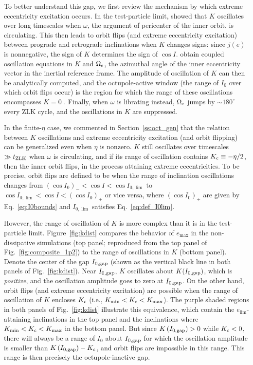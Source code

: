 \documentclass[
        fleqn,
        usenatbib,
    ]{mnras}
\newcommand*{\p}[1]{\left(#1\right)}
\begin{document}
To better understand this gap, we first review the mechanism by which extreme
eccentricity excitation occurs. In the test-particle limit, \citet{katz2011long}
showed that $K$ oscillates over long timescales when $\omega$, the argument of
pericenter of the inner orbit, is circulating. This then leads to orbit flips
(and extreme eccentricity excitation) between prograde and retrograde
inclinations when $K$ changes signs: since $j(e)$ is nonnegative, the sign of
$K$ determines the sign of $\cos I$. \citet{katz2011long} obtain coupled
oscillation equations in $K$ and $\Omega_{\rm e}$, the azimuthal angle of the
inner eccentricity vector in the inertial reference frame. The amplitude of
oscillation of $K$ can then be analytically computed, and the octupole-active
window (the range of $I_0$ over which orbit flips occur) is the region for which
the range of these oscillations encompasses $K = 0$ \citep{katz2011long}.
Finally, when $\omega$ is librating instead, $\Omega_{\rm e}$ jumps by $\sim
180^\circ$ every ZLK cycle, and the oscillations in $K$ are suppressed.

In the finite-$\eta$ case, we commented in Section~\ref{ss:oct_gen} that the
relation between $K$ oscillations and extreme eccentricity excitation (and
orbit flipping) can be generalized even when $\eta$ is nonzero. $K$ still
oscillates over timescales $\gg t_{\rm ZLK}$ when $\omega$ is circulating, and
if its range of oscillation contains $K_{\rm c} \equiv -\eta / 2$, then the
inner orbit flips, in the process attaining extreme eccentricities. To be
precise, orbit flips are defined to be when the range of inclination
oscillations changes from $\p{\cos I_0}_- < \cos I < \cos I_{0, \lim}$ to $\cos
I_{0, \lim} < \cos I < \p{\cos I_0}_+$ or vice versa, where $\p{\cos I_0}_{\pm}$
are given by Eq.~\eqref{eq:I0bounds} and $I_{0, \lim}$ satisfies
Eq.~\eqref{eq:def_I0lim}.

However, the range of oscillation of $K$ is more complex than it is in the
test-particle limit. Figure~\ref{fig:kdist} compares the behavior of $e_{\max}$
in the non-dissipative simulations (top panel; reproduced from the top panel of
Fig.~\ref{fig:composite_1p2}) to the range of oscillations in $K$ (bottom
panel). Denote the center of the gap $I_{\rm 0, gap}$ (shown as the vertical
black line in both panels of Fig.~\ref{fig:kdist}). Near $I_{\rm 0, gap}$, $K$
oscillates about $K(I_{\rm 0, gap})$, which is \emph{positive}, and the
oscillation amplitude goes to zero at $I_{\rm 0, gap}$. On the other hand, orbit
flips (and extreme eccentricity excitation) are possible when the range of
oscillation of $K$ encloses $K_{\rm c}$ (i.e., $K_{\min} < K_{\rm c} <
K_{\max}$). The purple shaded regions in both panels of Fig.~\ref{fig:kdist}
illustrate this equivalence, which contain the $e_{\lim}$-attaining inclinations
in the top panel and the inclinations where $K_{\min} < K_{\rm c} < K_{\max}$ in
the bottom panel. But since $K\p{I_{\rm 0, gap}} > 0$ while $K_{\rm c} < 0$,
there will always be a range of $I_0$ about $I_{\rm 0, gap}$ for which the
oscillation amplitude is smaller than $K\p{I_{\rm 0, gap}} - K_{\rm c}$, and
orbit flips are impossible in this range. This range is then precisely the
octupole-inactive gap.
\end{document}
